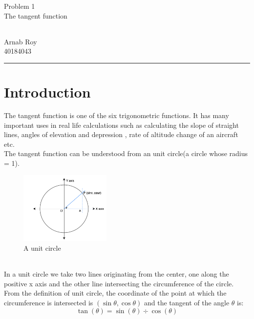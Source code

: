 \documentclass[12pt]{article}
\begin{document}
\begin{center}
    \large{Problem 1}\\
    \huge{The tangent function}
    
    \\[10pt]
    
    \large{Arnab Roy} \\
    \large{40184043}
\end{center}
\rule{\textwidth}{0.5pt}

\section{Introduction}
    The tangent function is one of the six trigonometric functions. It has many important uses in real life calculations such as calculating the slope of straight lines, angles of elevation and depression \cite{tanexamplewebsite1}, rate of altitude change of an aircraft \cite{tanexamplewebsite2} etc. \\
    The tangent function can be understood from an unit circle(a circle whose radius = 1).
    \begin{figure} [!h]
        \centering
        \includegraphics[width=0.4\textwidth]{Unit-circle.png}
        \caption{A unit circle}
        \label{fig:unit_circle}
    \end{figure} \\
    In a unit circle we take two lines originating from the center, one along the positive x axis and the other line intersecting the circumference of the circle. From the definition of unit circle, the coordinate of the point at which the circumference is intersected is $(\sin\theta, \cos\theta)$ \cite{unitcirclewebsite} and the tangent of the angle $\theta$ is:
    \begin{equation}
        \tan(\theta) = \sin(\theta) \div \cos(\theta) \label{tan_formula_1}
    \end{equation}
\end{document}
